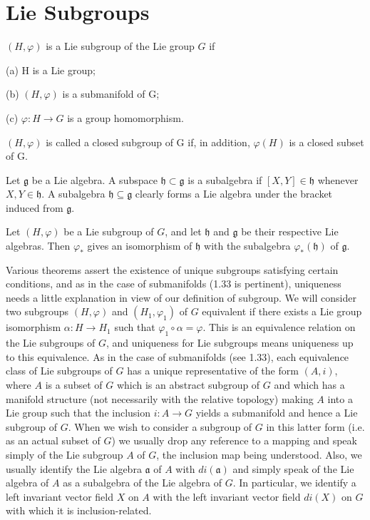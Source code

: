\section{Lie Subgroups}

\begin{definition}\label{thm:3.17}
$(H,\varphi)$ is a Lie subgroup of the Lie group $G$ if 

(a) H is a Lie group;

(b)  $ (H,\varphi) $ is a submanifold of G;

(c)  $ \varphi\colon H \to G $ is a group homomorphism.

$ (H,\varphi) $ is called a closed subgroup of G if, in addition,  $ \varphi(H) $ is a closed subset of G.

Let $\mathfrak{g}$ be a Lie algebra. A subspace $\mathfrak{h} \subset \mathfrak{g}$ is a subalgebra if $[X, Y] \in \mathfrak{h}$ whenever $X, Y \in \mathfrak{h}$. A subalgebra $\mathfrak{h} \subseteq \mathfrak{g}$ clearly forms a Lie algebra under the bracket induced from $\mathfrak{g}$.

Let $(H,\varphi)$ be a Lie subgroup of $G$, and let $\mathfrak{h}$ and $\mathfrak{g}$ be their respective Lie algebras. Then $\varphi_{*}$ gives an isomorphism of $\mathfrak{h}$ with the subalgebra $\varphi_{*}(\mathfrak{h})$ of $\mathfrak{g}$.

Various theorems assert the existence of unique subgroups satisfying certain conditions, and as in the case of submanifolds (1.33 is pertinent), uniqueness needs a little explanation in view of our definition of subgroup. We will consider two subgroups $(H,\varphi)$ and $(H_{1},\varphi_{1})$ of $G$ equivalent if there exists a Lie group isomorphism $\alpha: H \to H_{1}$ such that $\varphi_{1} \circ \alpha = \varphi$. This is an equivalence relation on the Lie subgroups of $G$, and uniqueness for Lie subgroups means uniqueness up to this equivalence. As in the case of submanifolds (see 1.33), each equivalence class of Lie subgroups of $G$ has a unique representative of the form $(A,i)$, where $A$ is a subset of $G$ which is an abstract subgroup of $G$ and which has a manifold structure (not necessarily with the relative topology) making $A$ into a Lie group such that the inclusion $i: A \to G$ yields a submanifold and hence a Lie subgroup of $G$. When we wish to consider a subgroup of $G$ in this latter form (i.e. as an actual subset of $G$) we usually drop any reference to a mapping and speak simply of the Lie subgroup $A$ of $G$, the inclusion map being understood. Also, we usually identify the Lie algebra $\mathfrak{a}$ of $A$ with $di(\mathfrak{a})$ and simply speak of the Lie algebra of $A$ as a subalgebra of the Lie algebra of $G$. In particular, we identify a left invariant vector field $X$ on $A$ with the left invariant vector field $di(X)$ on $G$ with which it is inclusion-related.


\end{definition}
